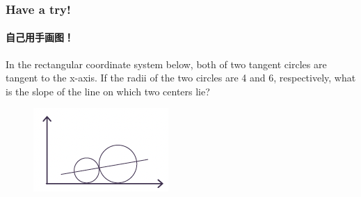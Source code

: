 \documentclass[
	11pt, %
]{beamer}
\begin{document}

\begin{frame}
	\frametitle{Have a try!}
	\framesubtitle{自己用手画图！}
In the rectangular coordinate system below, both of two tangent circles are tangent
to the x-axis. If the radii of the two circles are 4 and 6, respectively, what is the slope
of the line on which two centers lie?\\


		\begin{figure}
			\includegraphics[width=0.5\linewidth]{Tangent_Example_Question1.png}
		\end{figure}	


\end{frame}

\end{document}
